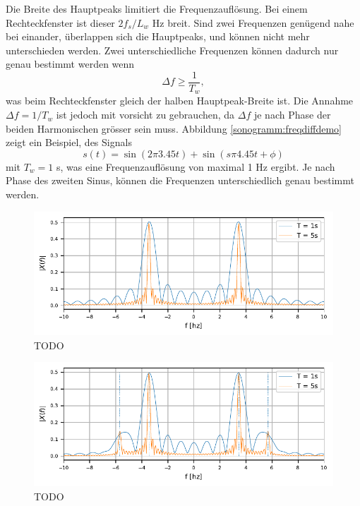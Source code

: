 Die Breite des Hauptpeaks limitiert die Frequenzauflösung.
Bei einem Rechteckfenster ist dieser $2f_s/L_w$ Hz breit.
Sind zwei Frequenzen genügend nahe bei einander, überlappen sich die Hauptpeaks, und können
nicht mehr unterschieden werden. 
Zwei unterschiedliche Frequenzen können dadurch nur genau bestimmt werden wenn
\begin{equation}
    \Delta f \geq \frac{1}{T_w},
\end{equation}
was beim Rechteckfenster gleich der halben Hauptpeak-Breite ist.
Die Annahme $\Delta f = 1/T_w$ ist jedoch mit vorsicht zu gebrauchen, da $\Delta f$ je nach 
Phase der beiden Harmonischen grösser sein muss.
Abbildung \ref{sonogramm:freqdiffdemo} zeigt ein Beispiel, des Signals
\begin{equation}
    s(t) = \sin(2\pi 3.45 t ) + \sin (s\pi 4.45 t + \phi)
\end{equation}
mit $T_w = 1$ s, was eine Frequenzauflösung von maximal 1 Hz ergibt.
Je nach Phase des zweiten Sinus, können die Frequenzen unterschiedlich genau
bestimmt werden.


\begin{figure}
    \centering
    \includegraphics{papers/sonogramm/images/RectWinHarmEx.pdf}
    \caption{TODO
    \label{sonogramm:leakageDemo}
    }
\end{figure}

\begin{figure}
    \centering
    \includegraphics{papers/sonogramm/images/twohamrrect.pdf}
    \caption{TODO
    \label{sonogramm:leakageDemo2}
    }
\end{figure}

